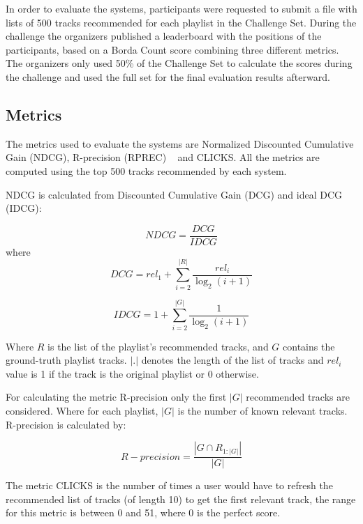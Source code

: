 In order to evaluate the systems, participants were requested to submit a file with lists of 500 tracks recommended for each playlist in the Challenge Set. During the challenge the organizers published a leaderboard with the positions of the participants, based on a Borda Count score combining three different metrics. The organizers only used 50\% of the Challenge Set to calculate the scores during the challenge and used the full set for the final evaluation results afterward.

\subsection{Metrics}

The metrics used to evaluate the systems are Normalized Discounted Cumulative Gain (NDCG), R-precision (RPREC) ~\cite{Ricci:2010:RSH:1941884} and CLICKS. All the metrics are computed using the top 500 tracks recommended by each system.

NDCG is calculated from Discounted Cumulative Gain (DCG) and ideal DCG (IDCG):


\begin{displaymath}
  NDCG = \frac{DCG}{IDCG} 
\end{displaymath}
where
\begin{displaymath}
  DCG = rel_{1} + \sum_{i=2}^{|R|} \frac{rel_{i}}{\log_{2} (i+1)}
\end{displaymath}

\begin{displaymath}
  IDCG = 1 + \sum_{i=2}^{|G|} \frac{1}{\log_{2} (i+1)}
\end{displaymath}

Where $R$ is the list of the playlist's recommended tracks, and $G$ contains the ground-truth playlist tracks. $| . |$ denotes the length of the list of tracks and $rel_{i}$ value is 1 if the track is the original playlist or 0 otherwise. 

For calculating the metric R-precision only the first $|G|$ recommended tracks are considered. Where for each playlist, $|G|$ is the number of known relevant tracks. R-precision is calculated by:

\begin{displaymath}
  R-precision = \frac{|G \cap R_{1:|G|}|}{|G|}
\end{displaymath}

The metric CLICKS is the number of times a user would have to refresh the recommended list of tracks (of length 10) to get the first relevant track, the range for this metric is between 0 and 51, where 0 is the perfect score.

